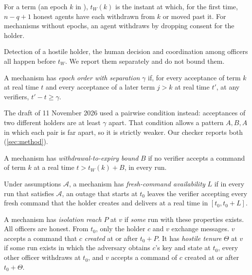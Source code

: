 \begin{dfn}
\label{def:tw}
For a term (an epoch $k$ in \sys{}), $t_W(k)$ is the instant at which, for the first time,
$n - q + 1$ honest agents have each withdrawn from $k$ or moved past it. For mechanisms
without epochs, an agent withdraws by dropping consent for the holder.
\end{dfn}

Detection of a hostile holder, the human decision and coordination among officers all
happen before $t_W$. We report them separately and do not bound them.

\begin{dfn}
\label{def:order}
A mechanism has \emph{epoch order with separation} $\gamma$ if, for every acceptance of
term $k$ at real time $t$ and every acceptance of a later term $j > k$ at real time $t'$,
at any verifiers, $t' - t \ge \gamma$.
\end{dfn}

The draft of 11 November 2026 used a pairwise condition instead: acceptances of two
different holders are at least $\gamma$ apart. That condition allows a pattern
$A, B, A$ in which each pair is far apart, so it is strictly weaker. Our checker
reports both (\cref{sec:method}).

\begin{dfn}
\label{def:wte}
A mechanism has \emph{withdrawal-to-expiry bound} $B$ if no verifier accepts a command
of term $k$ at a real time $t > t_W(k) + B$, in every run.
\end{dfn}

\begin{dfn}
\label{def:avail}
Under assumptions $\mathcal{A}$, a mechanism has \emph{fresh-command availability} $L$ if
in every run that satisfies $\mathcal{A}$, an outage that starts at $t_0$ leaves the
verifier accepting every fresh command that the holder creates and delivers at a real
time in $[t_0, t_0 + L]$.
\end{dfn}

\begin{dfn}
\label{def:reach}
A mechanism has \emph{isolation reach} $P$ at $v$ if \emph{some} run with these properties
exists. All officers are honest. From $t_0$, only the holder $c$ and $v$ exchange
messages. $v$ accepts a command that $c$ \emph{created} at or after $t_0 + P$. It has
\emph{hostile tenure} $\Theta$ at $v$ if some run exists in which the adversary obtains
$c$'s key and state at $t_0$, every other officer withdraws at $t_0$, and $v$ accepts a
command of $c$ created at or after $t_0 + \Theta$.
\end{dfn}

